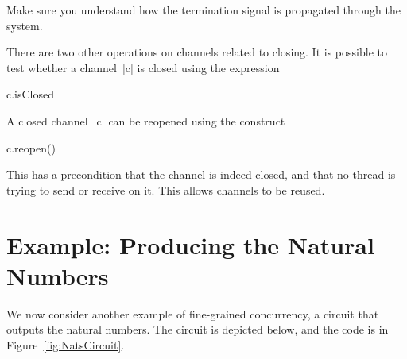 \begin{instruction}
Make sure you understand how the termination signal is propagated through the
system. 
\end{instruction}

There are two other operations on channels related to closing. 
It is possible to test whether a channel~|c| is closed using the expression
%
\begin{scala}
  c.isClosed
\end{scala}
%
A closed channel~|c| can be reopened using the construct
\begin{scala}
  c.reopen()
\end{scala}
%
This has a precondition that the channel is indeed closed, and that no thread
is trying to send or receive on it.  This allows channels to be reused.



\section{Example: Producing the Natural Numbers}

We now consider another example of fine-grained concurrency, a circuit that
outputs the natural numbers.  The circuit is depicted below, and the code is
in Figure~\ref{fig:NatsCircuit}. 

\begin{center}
\end{center}



